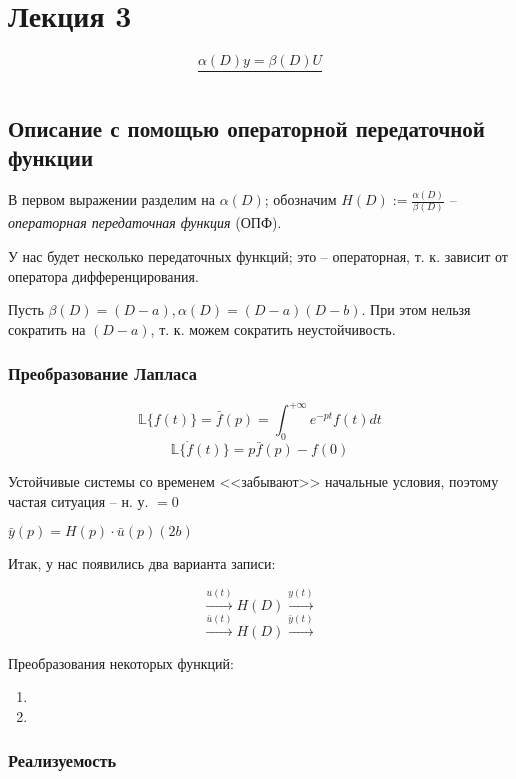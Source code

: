 \documentclass[main.tex]{subfiles}
\begin{document}
\newpage
\section{ Лекция 3 }

$$ \frac{\alpha(D)y = \beta(D)U}{ } $$ %

\subsection{Описание с помощью операторной передаточной функции}

В первом выражении разделим на $ \alpha(D) $; обозначим $ H(D) := \frac{\alpha(D)}{\beta(D)} $ -- \emph{операторная передаточная функция} (ОПФ).

У нас будет несколько передаточных функций; это -- операторная, т. к. зависит от оператора дифференцирования.

Пусть $ \beta(D) = (D - a), \alpha(D) = (D-a)(D-b) $.
При этом нельзя сократить на $ (D - a) $, т. к. можем сократить неустойчивость. %

\subsubsection{Преобразование Лапласа}

$$ \mathds{L}\{f(t)\} = \bar{f}(p) = \int_0^{+\infty} e^{-pt} f(t) dt $$
$$ \mathds{L}\{\dot f (t)\} = p \bar{f}(p)- f(0) $$

Устойчивые системы со временем <<забывают>> начальные условия, поэтому частая ситуация -- н. у. $= 0$


$ \boxed{\bar{y}(p) = H(p) \cdot \bar{u}(p) }  (2b) $ %

Итак, у нас появились два варианта записи:

$$ \xrightarrow{u(t)} \boxed{H(D)}\xrightarrow{y(t)} $$
$$ \xrightarrow{\bar u(t)} \boxed{H(D)} \xrightarrow{ \bar y(t)} $$

Преобразования некоторых функций: %

\begin{enumerate}[noitemsep]
    \item
    \item
\end{enumerate}

\subsubsection{Реализуемость}
\end{document}
